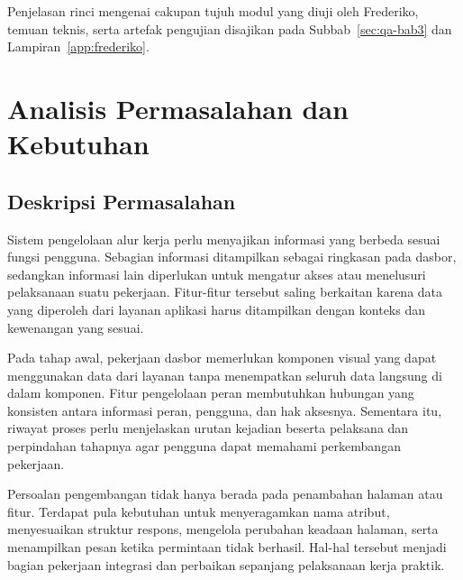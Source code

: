 Penjelasan rinci mengenai cakupan tujuh modul yang diuji oleh Frederiko, temuan teknis, serta artefak pengujian disajikan pada Subbab~\ref{sec:qa-bab3} dan Lampiran~\ref{app:frederiko}.

\section{Analisis Permasalahan dan Kebutuhan}
\subsection{Deskripsi Permasalahan}
Sistem pengelolaan alur kerja perlu menyajikan informasi yang berbeda sesuai fungsi pengguna. Sebagian informasi ditampilkan sebagai ringkasan pada dasbor, sedangkan informasi lain diperlukan untuk mengatur akses atau menelusuri pelaksanaan suatu pekerjaan. Fitur-fitur tersebut saling berkaitan karena data yang diperoleh dari layanan aplikasi harus ditampilkan dengan konteks dan kewenangan yang sesuai.

Pada tahap awal, pekerjaan dasbor memerlukan komponen visual yang dapat menggunakan data dari layanan tanpa menempatkan seluruh data langsung di dalam komponen. Fitur pengelolaan peran membutuhkan hubungan yang konsisten antara informasi peran, pengguna, dan hak aksesnya. Sementara itu, riwayat proses perlu menjelaskan urutan kejadian beserta pelaksana dan perpindahan tahapnya agar pengguna dapat memahami perkembangan pekerjaan.

Persoalan pengembangan tidak hanya berada pada penambahan halaman atau fitur. Terdapat pula kebutuhan untuk menyeragamkan nama atribut, menyesuaikan struktur respons, mengelola perubahan keadaan halaman, serta menampilkan pesan ketika permintaan tidak berhasil. Hal-hal tersebut menjadi bagian pekerjaan integrasi dan perbaikan sepanjang pelaksanaan kerja praktik.

